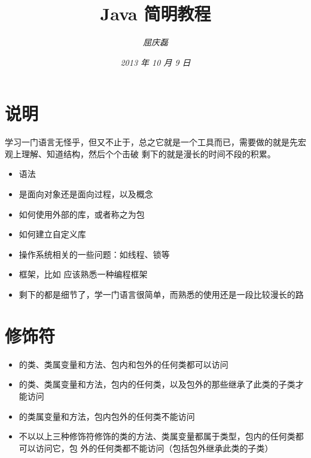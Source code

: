 \documentclass{article}
\begin{document}
\title{%
  {\huge \textsf{Java 简明教程}\\\smallskip}%
}

\author{\textit{屈庆磊}\\[2mm]
       }

\date{\textit{2013 年 10 月 9 日}}

\maketitle
\begin{multicols}{2}
\tableofcontents
\end{multicols}

\section{说明}
学习一门语言无怪乎，但又不止于，总之它就是一个工具而已，需要做的就是先宏观上理解、知道结构，然后个个击破
剩下的就是漫长的时间不段的积累。
\begin{itemize}
\item 语法
\item 是面向对象还是面向过程，以及概念
\item 如何使用外部的库，或者称之为包
\item 如何建立自定义库
\item 操作系统相关的一些问题：如线程、锁等
\item 框架，比如 应该熟悉一种编程框架
\item 剩下的都是细节了，学一门语言很简单，而熟悉的使用还是一段比较漫长的路
\end{itemize}

\section{修饰符}
\begin{itemize}
\item {} 的类、类属变量和方法、包内和包外的任何类都可以访问
\item {} 的类、类属变量和方法，包内的任何类，以及包外的那些继承了此类的子类才能访问
\item {} 的类属变量和方法，包内包外的任何类不能访问
\item 不以以上三种修饰符修饰的类的方法、类属变量都属于类型，包内的任何类都可以访问它，包
外的任何类都不能访问（包括包外继承此类的子类）
\end{itemize}
\end{document}
